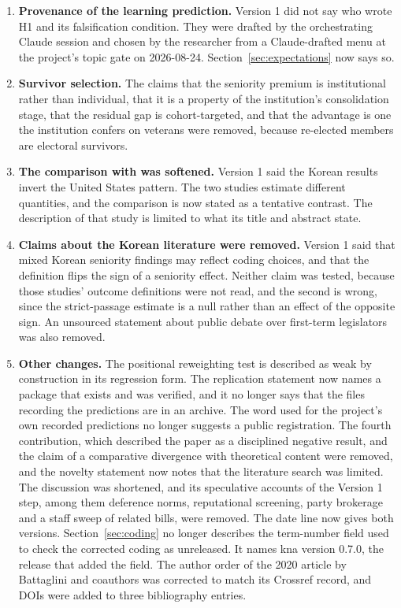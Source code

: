 \documentclass[11pt]{article}
\begin{document}
{\begin{enumerate}
\item \textbf{Provenance of the learning prediction.} Version 1 did not say who wrote H1 and its falsification condition. They were drafted by the orchestrating Claude session and chosen by the researcher from a Claude-drafted menu at the project's topic gate on 2026-08-24. Section~\ref{sec:expectations} now says so.
\item \textbf{Survivor selection.} The claims that the seniority premium is institutional rather than individual, that it is a property of the institution's consolidation stage, that the residual gap is cohort-targeted, and that the advantage is one the institution confers on veterans were removed, because re-elected members are electoral survivors.
\item \textbf{The comparison with \citet{casas2020} was softened.} Version 1 said the Korean results invert the United States pattern. The two studies estimate different quantities, and the comparison is now stated as a tentative contrast. The description of that study is limited to what its title and abstract state.
\item \textbf{Claims about the Korean literature were removed.} Version 1 said that mixed Korean seniority findings may reflect coding choices, and that the definition flips the sign of a seniority effect. Neither claim was tested, because those studies' outcome definitions were not read, and the second is wrong, since the strict-passage estimate is a null rather than an effect of the opposite sign. An unsourced statement about public debate over first-term legislators was also removed.
\item \textbf{Other changes.} The positional reweighting test is described as weak by construction in its regression form. The replication statement now names a package that exists and was verified, and it no longer says that the files recording the predictions are in an archive. The word used for the project's own recorded predictions no longer suggests a public registration. The fourth contribution, which described the paper as a disciplined negative result, and the claim of a comparative divergence with theoretical content were removed, and the novelty statement now notes that the literature search was limited. The discussion was shortened, and its speculative accounts of the Version 1 step, among them deference norms, reputational screening, party brokerage and a staff sweep of related bills, were removed. The date line now gives both versions. Section~\ref{sec:coding} no longer describes the term-number field used to check the corrected coding as unreleased. It names kna version 0.7.0, the release that added the field. The author order of the 2020 article by Battaglini and coauthors was corrected to match its Crossref record, and DOIs were added to three bibliography entries.
\end{enumerate}
}
\end{document}
